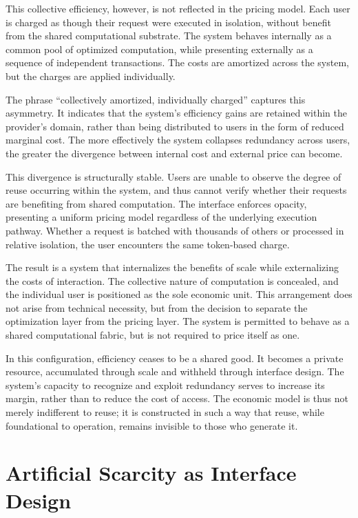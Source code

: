 \documentclass[12pt, oneside]{article}
\begin{document}
This collective efficiency, however, is not reflected in the pricing model. Each user is charged as though their request were executed in isolation, without benefit from the shared computational substrate. The system behaves internally as a common pool of optimized computation, while presenting externally as a sequence of independent transactions. The costs are amortized across the system, but the charges are applied individually.

The phrase ``collectively amortized, individually charged'' captures this asymmetry. It indicates that the system's efficiency gains are retained within the provider's domain, rather than being distributed to users in the form of reduced marginal cost. The more effectively the system collapses redundancy across users, the greater the divergence between internal cost and external price can become.

This divergence is structurally stable. Users are unable to observe the degree of reuse occurring within the system, and thus cannot verify whether their requests are benefiting from shared computation. The interface enforces opacity, presenting a uniform pricing model regardless of the underlying execution pathway. Whether a request is batched with thousands of others or processed in relative isolation, the user encounters the same token-based charge.

The result is a system that internalizes the benefits of scale while externalizing the costs of interaction. The collective nature of computation is concealed, and the individual user is positioned as the sole economic unit. This arrangement does not arise from technical necessity, but from the decision to separate the optimization layer from the pricing layer. The system is permitted to behave as a shared computational fabric, but is not required to price itself as one.

In this configuration, efficiency ceases to be a shared good. It becomes a private resource, accumulated through scale and withheld through interface design. The system's capacity to recognize and exploit redundancy serves to increase its margin, rather than to reduce the cost of access. The economic model is thus not merely indifferent to reuse; it is constructed in such a way that reuse, while foundational to operation, remains invisible to those who generate it.

\section{Artificial Scarcity as Interface Design}
\end{document}
